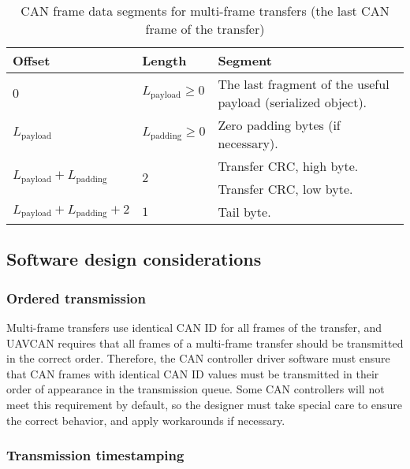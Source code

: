 \begin{table}[H]\caption{CAN frame data segments for multi-frame transfers (the last CAN frame of the transfer)}
\label{table:can_data_segments_multi_frame_last}
\begin{tabu}{|l l X|}
    \hline
    \rowfont{\bfseries}
    Offset                  & Length                     & Segment \\\hline
    $0$                     & $L_\text{payload}\geq{}0$  & The last fragment of the useful payload
                                                           (serialized object). \\\hline
    $L_\text{payload}$      & $L_\text{padding}\geq{}0$  & Zero padding bytes (if necessary). \\\hline

     &  &
                                                           Transfer CRC, high byte.\\
                            &                            & Transfer CRC, low byte.\\\hline

    $L_\text{payload} + L_\text{padding} + 2$ & $1$        & Tail byte. \\\hline
\end{tabu}
\end{table}

\subsection{Software design considerations}

\subsubsection{Ordered transmission}

Multi-frame transfers use identical CAN ID for all frames of the transfer,
and UAVCAN requires that all frames of a multi-frame transfer should be transmitted in the correct order.
Therefore, the CAN controller driver software must ensure that CAN frames with identical CAN ID values
must be transmitted in their order of appearance in the transmission queue.
Some CAN controllers will not meet this requirement by default,
so the designer must take special care to ensure the correct behavior, and apply workarounds if necessary.

\subsubsection{Transmission timestamping}

